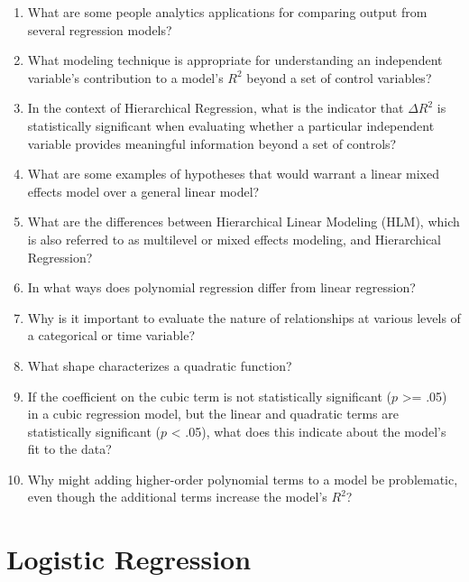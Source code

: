 \documentclass[
]{book}
\begin{document}
\begin{enumerate}
\def\labelenumi{\arabic{enumi}.}
\item
  What are some people analytics applications for comparing output from several regression models?
\item
  What modeling technique is appropriate for understanding an independent variable's contribution to a model's \(R^2\) beyond a set of control variables?
\item
  In the context of Hierarchical Regression, what is the indicator that \(\Delta{R^2}\) is statistically significant when evaluating whether a particular independent variable provides meaningful information beyond a set of controls?
\item
  What are some examples of hypotheses that would warrant a linear mixed effects model over a general linear model?
\item
  What are the differences between Hierarchical Linear Modeling (HLM), which is also referred to as multilevel or mixed effects modeling, and Hierarchical Regression?
\item
  In what ways does polynomial regression differ from linear regression?
\item
  Why is it important to evaluate the nature of relationships at various levels of a categorical or time variable?
\item
  What shape characterizes a quadratic function?
\item
  If the coefficient on the cubic term is not statistically significant (\(p\) \textgreater= .05) in a cubic regression model, but the linear and quadratic terms are statistically significant (\(p\) \textless{} .05), what does this indicate about the model's fit to the data?
\item
  Why might adding higher-order polynomial terms to a model be problematic, even though the additional terms increase the model's \(R^2\)?
\end{enumerate}

\hypertarget{log}{%
\chapter{Logistic Regression}\label{log}}
\end{document}
